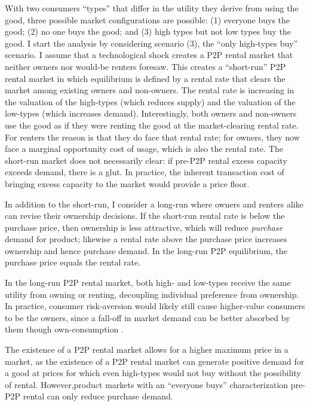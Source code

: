 \documentclass[11pt]{article}
\begin{document}
With two consumers ``types'' that differ in the utility they derive from using the good, three possible market configurations are possible: 
(1) everyone buys the good; (2) no one buys the good;  and (3) high types but not low types buy the good.  
I start the analysis by considering scenario (3), the  ``only high-types buy'' scenario. 
I assume that a technological shock creates a P2P rental market that neither owners nor would-be renters foresaw. 
This creates a ``short-run'' P2P rental market in which equilibrium is defined by a rental rate that clears the market among existing owners and non-owners. 
The rental rate is increasing in the valuation of the high-types (which reduces supply) and the valuation of the low-types (which increases demand). 
Interestingly, both owners and non-owners use the good as if they were renting the good at the market-clearing rental rate. 
For renters the reason is that they do face that rental rate; 
for owners, they now face a marginal opportunity cost of usage, which is also the rental rate. 
The short-run market does not necessarily clear: if pre-P2P rental excess capacity exceeds demand, there is a glut. 
In practice, the inherent transaction cost of bringing excess capacity to the market would provide a price floor.     

In addition to the short-run, I consider a long-run where owners and renters alike can revise their ownership decisions. 
If the short-run rental rate is below the purchase price, then ownership is less attractive, which will reduce \emph{purchase} demand for product; likewise a rental rate above the purchase price increases ownership and hence purchase demand.
In the long-run P2P equilibrium, the purchase price equals the rental rate.  

In the long-run P2P rental market, both high- and low-types receive the same utility from owning or renting, decoupling individual preference from ownership. 
In practice, consumer risk-aversion would likely still cause higher-value consumers to be the owners, since a fall-off in market demand can be better absorbed by them though own-consumption \citep{sinai2005}. 

The existence of a P2P rental market allows for a higher maximum price in a market, as the existence of a P2P rental market can generate positive demand for a good at prices for which even high-types would not buy without the possibility of rental. 
However,product markets with an ``everyone buys'' characterization pre-P2P rental can only reduce purchase demand. 
\end{document}
